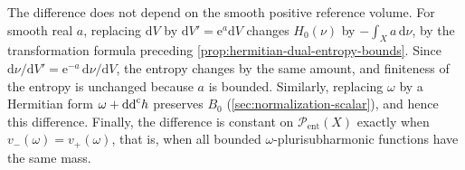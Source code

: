 The difference does not depend on the smooth positive reference volume. For smooth real $a$, replacing $\mathrm{d}V$ by $\mathrm{d}V'=\mathrm{e}^a\mathrm{d}V$ changes $H_0(\nu)$ by $-\int_Xa\,\mathrm{d}\nu$, by the transformation formula preceding \cref{prop:hermitian-dual-entropy-bounds}. Since $\mathrm{d}\nu/\mathrm{d}V'=\mathrm{e}^{-a}\,\mathrm{d}\nu/\mathrm{d}V$, the entropy changes by the same amount, and finiteness of the entropy is unchanged because $a$ is bounded. Similarly, replacing $\omega$ by a Hermitian form $\omega+\mathrm{dd}^{\mathrm{c}} h$ preserves $B_0$ (\cref{sec:normalization-scalar}), and hence this difference. Finally, the difference is constant on $\mathcal P_{\mathrm{ent}}(X)$ exactly when $v_-(\omega)=v_+(\omega)$, that is, when all bounded $\omega$-plurisubharmonic functions have the same mass.
